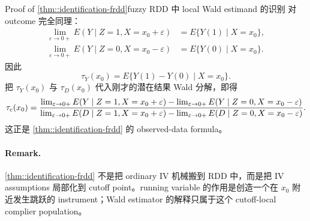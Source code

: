 \begin{exercisesolution}{Proof of \cref{thm::identification-frdd}}{fuzzy RDD 中 local Wald estimand 的识别}
对 outcome 完全同理：
\begin{align*}
\lim_{\varepsilon\to 0+}E(Y\mid Z=1,X=x_0+\varepsilon)
&=
E\{Y(1)\mid X=x_0\},\\
\lim_{\varepsilon\to 0+}E(Y\mid Z=0,X=x_0-\varepsilon)
&=
E\{Y(0)\mid X=x_0\}.
\end{align*}
因此
\[
\tau_Y(x_0)
=
E\{Y(1)-Y(0)\mid X=x_0\}.
\]
把 $\tau_Y(x_0)$ 与 $\tau_D(x_0)$ 代入刚才的潜在结果 Wald 分解，即得
\[
\tau_{\textup{c}}(x_0)
=
\frac{
\lim_{\varepsilon \rightarrow 0+} E( Y \mid Z=1, X=x_0+\varepsilon )
-
\lim_{\varepsilon \rightarrow 0+} E( Y \mid Z=0, X=x_0-\varepsilon )
}{
\lim_{\varepsilon \rightarrow 0+} E( D \mid Z=1, X=x_0+\varepsilon )
-
\lim_{\varepsilon \rightarrow 0+} E( D \mid Z=0, X=x_0-\varepsilon )
}.
\]
这正是 \cref{thm::identification-frdd} 的 observed-data formula。

\paragraph{Remark.}
\cref{thm::identification-frdd} 不是把 ordinary IV 机械搬到 RDD 中，而是把 IV assumptions 局部化到 cutoff point。running variable 的作用是创造一个在 $x_0$ 附近发生跳跃的 instrument；Wald estimator 的解释只属于这个 cutoff-local complier population。
\end{exercisesolution}

